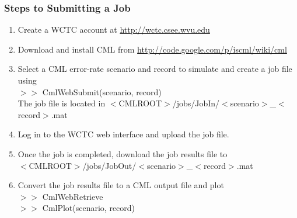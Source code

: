 \begin{frame}
\frametitle{Steps to Submitting a Job}

\begin{enumerate}
\item Create a WCTC account at \url{http://wctc.csee.wvu.edu}

\item Download and install CML from \url{http://code.google.com/p/iscml/wiki/cml}

\item Select a CML error-rate scenario and record to simulate and create a job file using
\\ $>>$ CmlWebSubmit(scenario, record)
\vspace{3mm}
\\ The job file is located in $<$CMLROOT$>$/jobs/JobIn/$<$scenario$>$\_$<$record$>$.mat

\item Log in to the WCTC web interface and upload the job file.

\item Once the job is completed, download the job results file to \\
$<$CMLROOT$>$/jobs/JobOut/$<$scenario$>$\_$<$record$>$.mat

\item Convert the job results file to a CML output file and plot
\\ $>>$ CmlWebRetrieve
\\ $>>$ CmlPlot(scenario, record)
\end{enumerate}

\end{frame}
